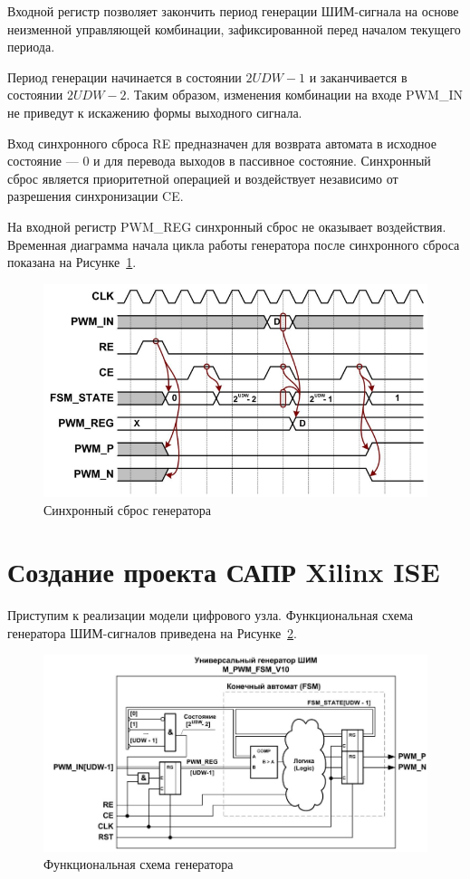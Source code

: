 Входной регистр позволяет закончить период генерации ШИМ-сигнала на
основе неизменной управляющей комбинации, зафиксированной перед
началом текущего периода. 

Период генерации начинается в состоянии $2UDW - 1$ и заканчивается в состоянии $2UDW - 2$. Таким образом, изменения
комбинации на входе PWM\_IN не приведут к искажению формы выходного
сигнала.

Вход синхронного сброса RE предназначен для возврата автомата в
исходное состояние --- 0 и для перевода выходов в пассивное состояние.
Синхронный сброс является приоритетной операцией и воздействует
независимо от разрешения синхронизации CE. 

На входной регистр
PWM\_REG синхронный сброс не оказывает воздействия.
Временная диаграмма начала цикла работы генератора после синхронного
сброса показана на Рисунке~\ref{fig:sync-rst}. 

\begin{figure}[h!]
	\centering
	\includegraphics[width=0.54\linewidth]{course-plis/images/lab4/sync-rst}
	\caption{Синхронный сброс генератора}
	\label{fig:sync-rst}
\end{figure}




\section{Создание проекта САПР Xilinx ISE}
Приступим к реализации модели цифрового узла. Функциональная схема генератора ШИМ-сигналов приведена на
Рисунке~\ref{fig:func-scheme}.

\begin{figure}[h!]
	\centering
	\includegraphics[width=0.65\linewidth]{course-plis/images/lab4/func-scheme}
	\caption{Функциональная схема генератора}
	\label{fig:func-scheme}
\end{figure}

